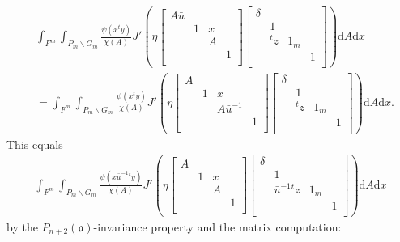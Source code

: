 \documentclass[11pt]{amsart}
\newcommand\oo{\mathfrak{o}}
\newcommand\dr{\mathrm{d}}
\newcommand\1{\mathbf{1}}
\newcommand\bs{\backslash}%
\newcommand\bu{\bar{u}}
\numberwithin{equation}{section}
\begin{document}
\begin{align*}
& \int_{F^m} \int_{P_m \bs G_m} \frac{\psi(x{}^ty)}{\chi(A)} J'(\eta \begin{bmatrix}
A \bu & & &  \\
& 1 & x  & \\
&  &A&  \\
& & &1  \\
\end{bmatrix}
\begin{bmatrix}
\delta & & &  \\
& 1& & \\
& {}^tz &1_m &  \\
& &  &1  \\
\end{bmatrix}) \dr A \dr x \\
&= 
 \int_{F^m} \int_{P_m \bs G_m}\frac{\psi(x{}^ty)}{\chi(A)} J'(\eta \begin{bmatrix}
A & & &  \\
& 1 & x  & \\
&  &A \bu^{-1} &  \\
& & &1  \\
\end{bmatrix}
\begin{bmatrix}
\delta & & &  \\
& 1& & \\
& {}^tz &1_m &  \\
& &  &1  \\
\end{bmatrix}) \dr A \dr x.
\end{align*}
This equals 
\begin{align*}
\int_{F^m} \int_{P_m \bs G_m} \frac{\psi(x\bu^{-1}{}^ty)}{\chi(A)} J'(\eta \begin{bmatrix}
A & & &  \\
& 1 & x  & \\
&  &A &  \\
& & &1  \\
\end{bmatrix}
\begin{bmatrix}
\delta & & &  \\
& 1& & \\
& \bu^{-1} {}^tz &1_m &  \\
& &  &1  \\
\end{bmatrix}) \dr A \dr x
\end{align*} 
by the $P_{n+2}(\oo)$-invariance property and the matrix computation:
\end{document}
